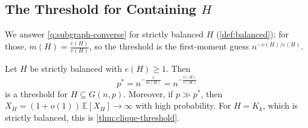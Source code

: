 
\subsection{The Threshold for Containing \texorpdfstring{\(H\)}{H}}

We answer \autoref{q:subgraph-converse} for strictly balanced \(H\) (\autoref{def:balanced}); for those, \(m(H) = \frac{e(H)}{v(H)}\), so the threshold is the first-moment guess \(n^{-v(H)/e(H)}\).

\begin{theorem}\label{thm:subgraph-threshold}
    Let \(H\) be strictly balanced with \(e(H) \ge 1\). Then
    \[
        p^{*} = n^{-\frac{1}{m(H)}} = n^{-\frac{v(H)}{e(H)}}
    \]
    is a threshold for \(H \subseteq G(n,p)\). Moreover, if \(p \gg p^{*}\), then \(X_H = (1+o(1))\,\mathbb{E}[X_H] \to \infty\) with high probability. For \(H = K_k\), which is strictly balanced, this is \autoref{thm:clique-threshold}.
\end{theorem}


